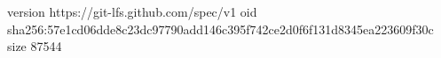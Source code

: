 version https://git-lfs.github.com/spec/v1
oid sha256:57e1cd06dde8c23dc97790add146c395f742ce2d0f6f131d8345ea223609f30c
size 87544
